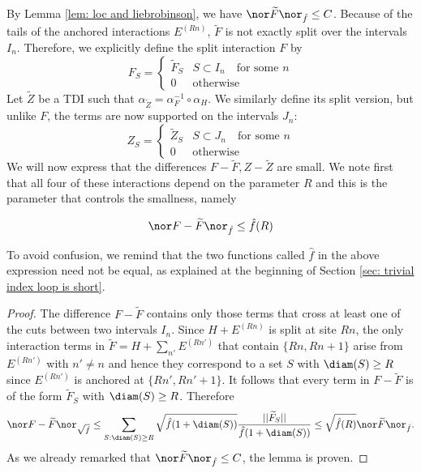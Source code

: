 By Lemma \ref{lem: loc and liebrobinson}, we have $\nor\widetilde F\nor_{\hat{f}}\leq C$.
Because of the tails of the anchored interactions $E^{(Rn)}$, $\widetilde F$ is not exactly split over the intervals $I_n$.
Therefore, we explicitly define the split interaction $F$ by
$$
F_S=\begin{cases}  \widetilde F_S & S \subset I_n \quad \text{for some $n$} \\
	0  & \text{otherwise}
\end{cases}
$$
Let $\widetilde Z$ be a TDI 
such that  $\alpha_{\widetilde Z}=\alpha_{F}^{-1} \circ \alpha_H$. We similarly define its split version, but unlike $F$, the terms are now supported on the intervals $J_n$:
$$
Z_S=\begin{cases}  \widetilde Z_S & S \subset J_n \quad \text{for some $n$} \\
	0  & \text{otherwise}
\end{cases}
$$
We will now express that the differences $F-\widetilde F, Z-\widetilde Z$ are small. We note first that all four of these interactions depend on the parameter $R$ and this is the parameter that controls the smallness, namely
\begin{lemma}\label{lem: small difference f}
	$$
	\nor F-\widetilde F\nor_{\hat{f}} \leq \hat{f}(R)
	$$
\end{lemma}
\noindent To avoid confusion, we remind that the two functions called $\hat{f}$ in the above expression need not be equal,  as explained at the beginning of Section \ref{sec: trivial index loop is short}.
\begin{proof} 
	The difference $F-\widetilde F$ contains only those terms that cross at least one of the cuts between two intervals $I_n$. Since $H+E^{(Rn)}$ is split at site $Rn$, the only interaction terms in $\widetilde F=H+\sum_{n'} E^{(Rn')}$ that contain $\{Rn,Rn+1\}$ arise from $ E^{(Rn')}$ with $n' \neq n$ and hence they correspond to a set $S$ with $\diam(S)\geq R$ since $ E^{(Rn')}$ is anchored at $\{Rn',Rn'+1\}$. It follows that every term in $F-\widetilde F$ is of the form $\widetilde F_S$  with  $\diam(S)\geq R$.  Therefore
	$$\nor F-\widetilde F\nor_{\sqrt{\hat{f}}} \leq \sum_{S:\diam(S)\geq R}\sqrt{\hat f(1+\diam(S))}\frac{||\widetilde F_S||}{\hat f(1+\diam(S))}
	\leq \sqrt{\hat{f}(R)}  \nor \widetilde F \nor_{\hat{f}}. $$
	As we already remarked that $\nor \widetilde F \nor_{\hat{f}}\leq C$, the lemma is proven.
\end{proof}


